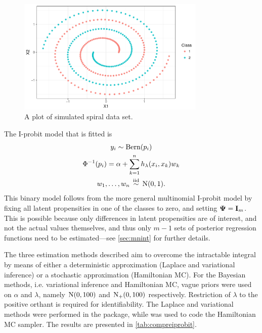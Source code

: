 \begin{figure}[hbt]
  \centering
  \includegraphics[width=0.8\textwidth]{figure/05-example_data}
  \caption{A plot of simulated spiral data set.}
  \label{fig:exampleiprobit}
\end{figure}

The I-probit model that is fitted is
\begin{gather*}
  y_i \sim \operatorname{Bern}(p_i) \\
  \Phi^{-1}(p_i) = \alpha + \sum_{k=1}^n h_\lambda(x_i,x_k)w_k  \\
  w_1,\dots,w_n \,\overset{\text{iid}}{\sim}\, \operatorname{N}(0,1).
\end{gather*}
This binary model follows from the more general multinomial I-probit model by fixing all latent propensities in one of the classes to zero, and setting ${\bm\Psi} = {\mathbf I}_m$.
This is possible because only differences in latent propensities are of interest, and not the actual values themselves, and thus only $m-1$ sets of posterior regression functions need to be estimated---see \cref{sec:mnint} for further details.

The three estimation methods described aim to overcome the intractable integral by means of either a deterministic approximation (Laplace and variational inference) or a stochastic approximation (Hamiltonian MC).
For the Bayesian methods, i.e. variational inference and Hamiltonian MC, vague priors were used on $\alpha$ and $\lambda$, namely $\operatorname{N}(0,100)$ and $\operatorname{N}_+(0,100)$ respectively.
Restriction of $\lambda$ to the positive orthant is required for identifiability.
The Laplace and variational methods were performed in the  package, while  was used to code the Hamiltonian MC sampler.
The results are presented in \cref{tab:compreiprobit}.

